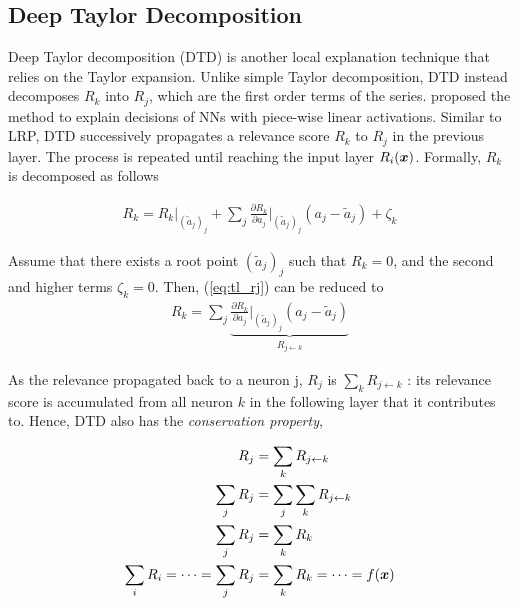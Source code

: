 \subsection{Deep Taylor Decomposition}


Deep Taylor decomposition (DTD) is another local explanation technique that relies on the Taylor expansion. Unlike simple Taylor decomposition, DTD instead decomposes $R_k$ into $R_j$, which are the first order terms of the series. \cite{MontavonExplainingnonlinearclassification2017} proposed the method to explain decisions of NNs with piece-wise linear activations. Similar to LRP, DTD successively propagates a relevance score  $R_k$ to $R_j$ in the previous layer. The process is repeated until reaching the input layer $R_i(\boldsymbol{x})$. Formally, $R_k$ is decomposed as follows




 \begin{align} \label{eq:tl_rj}
 R_k = R_k \bigg|_{ (\tilde{a}_j)_j } + \sum_{ j } 	\frac{\partial  R_k }{ \partial a_j } \bigg|_{ (\tilde{a}_j)_j } ( a_j - \tilde{a}_j ) + \zeta_k
 \end{align}

Assume that there exists a root point $(\tilde{a}_j)_j$ such that $R_k = 0$, and the second and higher terms $\zeta_k = 0 $. Then, (\ref{eq:tl_rj}) can be reduced to
\begin{align*}
 R_k = \sum_{ j } \underbrace{	\frac{\partial  R_k }{ \partial a_j } \bigg|_{ (\tilde{a}_j)_j }  ( a_j - \tilde{a}_j ) }_{ R_{j \leftarrow k } }
\end{align*}

As the relevance propagated back to a neuron j,  $R_j$ is $\sum_{k} R_{j\leftarrow k}$ : its relevance score is accumulated from all neuron $k$ in the following layer that it contributes to. Hence, DTD also has the  \textit{conservation property}, 

\begin{align} 
	R_j &= \sum_{k} R_{j\leftarrow k} \nonumber \\
\sum_{j}	R_j &= \sum_{j} \sum_{k} R_{j\leftarrow k} \nonumber\\
\sum_{j}	R_j &= \sum_{k}  R_{k} \nonumber \\
\sum_i 	R_{i} = 	\dots = \sum_j R_{j} &= \sum_k R_{k} = \dots =  f(\patvector{x}) \nonumber
\end{align}

